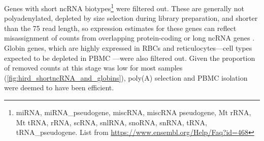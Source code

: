 
Genes with short \gls{ncRNA} biotypes\footnote{miRNA, miRNA\_pseudogene, miscRNA, miscRNA pseudogene, Mt rRNA, Mt tRNA, rRNA, scRNA, snlRNA, snoRNA, snRNA, tRNA, tRNA\_pseudogene. List from \url{https://www.ensembl.org/Help/Faq?id=468}} were filtered out.
These are generally not polyadenylated, depleted by size selection during library preparation, and shorter than the \SI{75}{\bp} read length, so expression estimates for these genes can reflect misassignment of counts from overlapping protein-coding or long \gls{ncRNA} genes \autocite{zhao2018EvaluationTwoMain}.
%
Globin genes, which are highly expressed in \glspl{RBC} and reticulocytes---cell types expected to be depleted in \gls{PBMC} \autocite{min2010VariabilityGeneExpression}---were also filtered out.
Given the proportion of removed counts at this stage was low for most samples (\cref{fig:hird_shortncRNA_and_globins}), 
poly(A) selection and \gls{PBMC} isolation were deemed to have been efficient.

